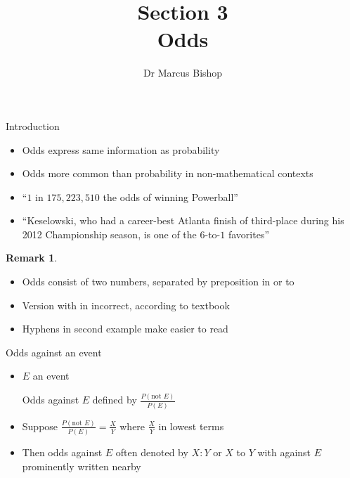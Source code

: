 \documentclass[handout]{beamer}
\title[\S3]{Section 3\\Odds}
\author{Dr Marcus Bishop}
\theoremstyle{definition}
\newtheorem{remark}{Remark}
\begin{document}
\begin{frame}\titlepage\end{frame}
\LogoOff

\begin{frame}{Introduction}
\begin{itemize}
\item \alert{Odds} express same information as probability
\item Odds more common than probability in non-mathematical contexts
\end{itemize}
\begin{example}
\begin{itemize}
\item ``\alert{$1$ in $175,223,510$} the odds of winning Powerball''
\item ``Keselowski, who had a career-best Atlanta finish of third-place
during his 2012 Championship season, is one of the \alert{$6$-to-$1$} favorites''
\end{itemize}
\end{example}
\begin{remark}
\begin{itemize}
\item Odds consist of two numbers, separated by preposition \alert{in} or \alert{to}
\item Version with \alert{in} incorrect, according to textbook
\item Hyphens in second example make easier to read
\end{itemize}
\end{remark}
\end{frame}

\begin{frame}{Odds against an event}
\begin{itemize}
\item $E$ an event
\begin{definition}
\alert{Odds against $E$} defined by
$\frac{P\left(\text{not $E$}\right)}{P\left(E\right)}$
\end{definition}
\item Suppose
$\frac{P\left(\text{not $E$}\right)}{P\left(E\right)}
=\frac{X}{Y}$ where $\frac{X}{Y}$ in \alert{lowest terms}
\item Then odds against $E$ often denoted by \alert{$X:Y$} or \alert{$X$ to $Y$}
with \alert{against $E$} prominently written nearby
\end{itemize}
\end{frame}
\end{document}
